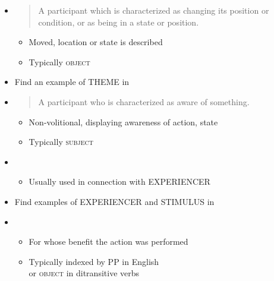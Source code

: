 \documentclass[a4paper,landscape,headrule,footrule,xetex]{foils}
\begin{document}
\begin{itemize}
\newpage
\item  {}
  \begin{quote}
     A participant which is characterized as changing its position or condition, or as
being in a state or position. 
  \end{quote}
  \begin{itemize}
  \item  Moved, location or state is described
  \item Typically \textsc{object}
\end{itemize}
\begin{exe}
  \ex {}
  \ex {}
  \ex {}
  \ex {}
  \ex *
\end{exe}
\item Find an example of THEME in \Story{}\task
\newpage

\item  {}
  \begin{quote}
    A participant who is characterized as aware of something.
  \end{quote}
  \begin{itemize}
  \item   Non-volitional, displaying awareness of action, state
  \item Typically \textsc{subject}
  \end{itemize}
  \begin{exe}
  \ex{}
  \ex{}
  \ex{}
\end{exe}
\item  {}
  \begin{itemize}
  \item  Usually used in connection with EXPERIENCER
  \end{itemize}
  \begin{exe}
  \ex{}
  \ex{}
\end{exe}
\item Find examples of EXPERIENCER and  STIMULUS in \Story{}\task

  \newpage
\item  {}
  \begin{itemize}
  \item   For whose benefit the action was performed
  \item   Typically indexed by  PP in English
    \\ or \textsc{object} in ditransitive verbs
  \end{itemize}
  \begin{exe}
  \ex{}
  \ex{}
\end{exe}


\end{itemize}
\end{document}
